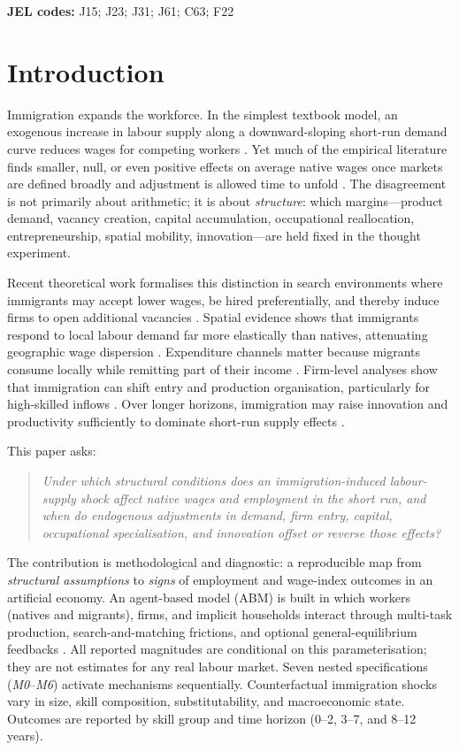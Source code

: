 \documentclass[11pt,a4paper]{article}
\begin{document}
\noindent\textbf{JEL codes:} J15; J23; J31; J61; C63; F22

\section{Introduction}
\label{sec:intro}

Immigration expands the workforce.
In the simplest textbook model, an exogenous increase in labour supply along a downward-sloping short-run demand curve reduces wages for competing workers \citep{borjas2003,borjas2016}.
Yet much of the empirical literature finds smaller, null, or even positive effects on average native wages once markets are defined broadly and adjustment is allowed time to unfold \citep{card1990,ottaviano2012,peri2016}.
The disagreement is not primarily about arithmetic; it is about \emph{structure}: which margins---product demand, vacancy creation, capital accumulation, occupational reallocation, entrepreneurship, spatial mobility, innovation---are held fixed in the thought experiment.

Recent theoretical work formalises this distinction in search environments where immigrants may accept lower wages, be hired preferentially, and thereby induce firms to open additional vacancies \citep{albert2021}.
Spatial evidence shows that immigrants respond to local labour demand far more elastically than natives, attenuating geographic wage dispersion \citep{cadenakovak2016,monras2020}.
Expenditure channels matter because migrants consume locally while remitting part of their income \citep{cheremukhin2024}.
Firm-level analyses show that immigration can shift entry and production organisation, particularly for high-skilled inflows \citep{waugh2018}.
Over longer horizons, immigration may raise innovation and productivity sufficiently to dominate short-run supply effects \citep{terry2026}.

This paper asks:
\begin{quote}
  \emph{Under which structural conditions does an immigration-induced labour-supply shock affect native wages and employment in the short run, and when do endogenous adjustments in demand, firm entry, capital, occupational specialisation, and innovation offset or reverse those effects?}
\end{quote}

The contribution is methodological and diagnostic: a reproducible map from \emph{structural assumptions} to \emph{signs} of employment and wage-index outcomes in an artificial economy.
An agent-based model (ABM) is built in which workers (natives and migrants), firms, and implicit households interact through multi-task production, search-and-matching frictions, and optional general-equilibrium feedbacks \citep{epstein2006,railsback2019}.
All reported magnitudes are conditional on this parameterisation; they are not estimates for any real labour market.
Seven nested specifications (\emph{M0}--\emph{M6}) activate mechanisms sequentially.
Counterfactual immigration shocks vary in size, skill composition, substitutability, and macroeconomic state.
Outcomes are reported by skill group and time horizon (0--2, 3--7, and 8--12 years).
\end{document}
